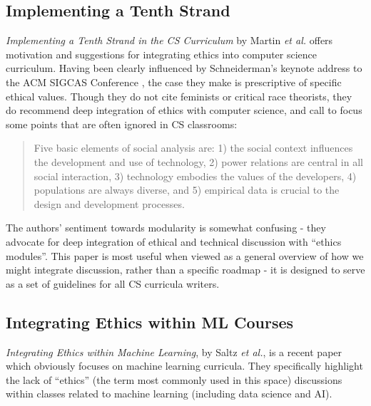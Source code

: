 \documentclass{article}
\newcommand{\etal}{\textit{et al.}}
\begin{document}
    \subsection{Implementing a Tenth Strand}
        \textit{Implementing a Tenth Strand in the CS Curriculum} by Martin \etal \cite{martinImplementingTenthStrand1996} offers motivation and suggestions for integrating ethics into computer science curriculum.
        Having been clearly influenced by Schneiderman's keynote address to the ACM SIGCAS Conference \cite{shneidermanHumanValuesFuture1990},
        the case they make is prescriptive of specific ethical values. Though they do not cite feminists or critical race theorists, they do recommend deep integration of ethics with computer science, and call to focus some points that are often ignored in CS classrooms:
        \begin{quote}
        Five basic elements of social analysis are: 1) the social context influences the development and use of technology, 2) power relations are central in all social interaction, 3) technology embodies the values of the developers, 4) populations are always diverse, and 5) empirical data is crucial to the design and development processes.
        \end{quote}
        The authors' sentiment towards modularity is somewhat confusing - they advocate for deep integration of ethical and technical discussion with ``ethics modules''.
        This paper is most useful when viewed as a general overview of how we might integrate discussion, rather than a specific roadmap - it is designed to serve as a set of guidelines for all CS curricula writers.
        
    \subsection{Integrating Ethics within ML Courses}
        \textit{Integrating Ethics within Machine Learning}, by Saltz \etal \cite{saltzIntegratingEthicsMachine2019}, is a recent paper which obviously focuses on machine learning curricula. They specifically highlight the lack of ``ethics'' (the term most commonly used in this space) discussions within classes related to machine learning (including data science and AI).
        
    
%
%


\end{document}
